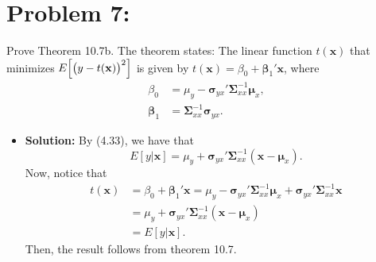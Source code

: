 \documentclass[11pt]{article}
\begin{document}
\section*{Problem 7:}
Prove Theorem 10.7b.  The theorem states:  The linear function $t(\mathbf{x})$ that minimizes $E\Big{[}\big{(}y-t(\mathbf{x})\big{)}^2\Big{]}$ is given by $t(\mathbf{x}) = \beta_0 + \bm\beta_1'\mathbf{x}$, where
\begin{align*}
\beta_0 &= \mu_y - \bm\sigma_{yx}'\bm\Sigma_{xx}^{-1}\bm\mu_x, \\
\bm\beta_1 &= \bm\Sigma_{xx}^{-1}\bm\sigma_{yx}.
\end{align*}
\begin{itemize}
\item[] \textbf{Solution:}  By (4.33), we have that
\[
E[y|\mathbf{x}] = \mu_y + \bm\sigma_{yx}'\bm\Sigma_{xx}^{-1}(\mathbf{x} - \bm\mu_x).
\]
Now, notice that 
\begin{align*}
t(\mathbf{x}) &= \beta_0 + \bm\beta_1'\mathbf{x} = \mu_y - \bm\sigma_{yx}'\bm\Sigma_{xx}^{-1}\bm\mu_x + \bm\sigma_{yx}'\bm\Sigma_{xx}^{-1}\mathbf{x} \\
&= \mu_y + \bm\sigma_{yx}'\bm\Sigma_{xx}^{-1}(\mathbf{x} - \bm\mu_x) \\
&= E[y|\mathbf{x}].
\end{align*}
Then, the result follows from theorem 10.7.
\end{itemize}
\end{document}
